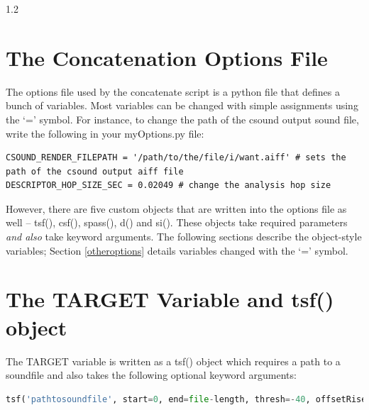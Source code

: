 \documentclass{article}
\begin{document}
\begin{spacing}{1.2}
\section{The Concatenation Options File}
The options file used by the concatenate script is a python file that defines a bunch of variables.  Most variables can be changed with simple assignments using the `=' symbol.  For instance, to change the path of the csound output sound file, write the following in your myOptions.py file:
\begin{lstlisting}
CSOUND_RENDER_FILEPATH = '/path/to/the/file/i/want.aiff' # sets the path of the csound output aiff file
DESCRIPTOR_HOP_SIZE_SEC = 0.02049 # change the analysis hop size
\end{lstlisting}


However, there are five custom objects that are written into the options file as well -- tsf(), csf(), spass(), d() and si().  These objects take required parameters \emph{and also} take keyword arguments.  The following sections describe the object-style variables; Section \ref{otheroptions} details variables changed with the `=' symbol.

\section{The TARGET Variable and tsf() object}\label{target}
The TARGET variable is written as a tsf() object which requires a path to a soundfile and also takes the following optional keyword arguments:

\begin{lstlisting}[language=python]
tsf('pathtosoundfile', start=0, end=file-length, thresh=-40, offsetRise=1.5, offsetThreshAdd=+12, offsetThreshAbs=-80, scaleDb=0, minSegLen=0.05, maxSegLen=1000, midiPitchMethod='composite', stretch=1, segmentationFilepath=None)
\end{lstlisting}


\end{spacing}
\end{document}

